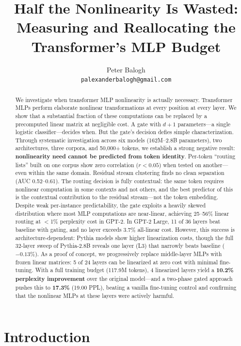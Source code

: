 \documentclass[11pt]{article}
\title{Half the Nonlinearity Is Wasted:\\Measuring and Reallocating the Transformer's MLP Budget}
\author{Peter Balogh\\{\small\texttt{palexanderbalogh@gmail.com}}}
\date{}
\begin{document}
\maketitle

\begin{abstract}
We investigate when transformer MLP nonlinearity is actually necessary. Transformer MLPs perform elaborate nonlinear transformations at every position at every layer. We show that a substantial fraction of these computations can be replaced by a precomputed linear matrix at negligible cost. A gate with $d{+}1$ parameters---a single logistic classifier---decides when. But the gate's decision defies simple characterization. Through systematic investigation across six models (162M--2.8B parameters), two architectures, three corpora, and 50,000+ tokens, we establish a strong negative result: \textbf{nonlinearity need cannot be predicted from token identity}. Per-token ``routing lists'' built on one corpus show zero correlation ($r < 0.05$) when tested on another---even within the same domain. Residual stream clustering finds no clean separation (AUC 0.52--0.61). The routing decision is fully contextual: the same token requires nonlinear computation in some contexts and not others, and the best predictor of this is the contextual contribution to the residual stream---not the token embedding. Despite weak per-instance predictability, the gate exploits a heavily skewed distribution where most MLP computations are near-linear, achieving 25--56\% linear routing at $<$1\% perplexity cost in GPT-2. In GPT-2 Large, 11 of 36 layers beat baseline with gating, and no layer exceeds 3.7\% all-linear cost. However, this success is architecture-dependent: Pythia models show higher linearization costs, though the full 32-layer sweep of Pythia-2.8B reveals one layer (L3) that narrowly beats baseline ($-0.13\%$). As a proof of concept, we progressively replace middle-layer MLPs with frozen linear matrices: 5 of 24 layers can be linearized at zero cost with minimal fine-tuning. With a full training budget (117.9M tokens), 4 linearized layers yield a \textbf{10.2\% perplexity improvement} over the original model---and a two-phase gated approach pushes this to \textbf{17.3\%} (19.00 PPL), beating a vanilla fine-tuning control and confirming that the nonlinear MLPs at these layers were actively harmful.
\end{abstract}

\section{Introduction}
\end{document}
